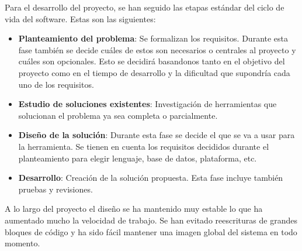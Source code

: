 Para el desarrollo del proyecto, se han seguido las etapas estándar del ciclo de vida del software. Estas son las siguientes:

\begin{itemize}
    \item \textbf{Planteamiento del problema}: Se formalizan los requisitos. Durante esta fase también se decide cuáles de estos son necesarios o centrales al proyecto y cuáles son opcionales. Esto se decidirá basandonos tanto en el objetivo del proyecto como en el tiempo de desarrollo y la dificultad que supondría cada uno de los requisitos.
    \item \textbf{Estudio de soluciones existentes}: Investigación de herramientas que solucionan el problema ya sea completa o parcialmente.
    \item \textbf{Diseño de la solución}: Durante esta fase se decide el  que se va a usar para la herramienta. Se tienen en cuenta los requisitos decididos durante el planteamiento para elegir lenguaje, base de datos, plataforma, etc.
    \item \textbf{Desarrollo}: Creación de la solución propuesta. Esta fase incluye también pruebas y revisiones.
\end{itemize}

A lo largo del proyecto el diseño se ha mantenido muy estable lo que ha aumentado mucho la velocidad de trabajo. Se han evitado reescrituras de grandes bloques de código y ha sido fácil mantener una imagen global del sistema en todo momento.